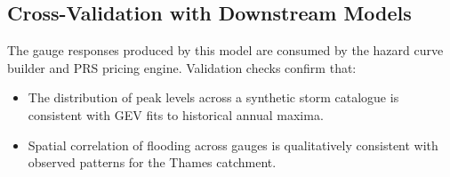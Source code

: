 \documentclass[11pt,a4paper]{article}
\begin{document}
\subsection{Cross-Validation with Downstream Models}

The gauge responses produced by this model are consumed by the hazard curve
builder and PRS pricing engine. Validation checks confirm that:
\begin{itemize}[nosep]
    \item The distribution of peak levels across a synthetic storm catalogue is
          consistent with GEV fits to historical annual maxima.
    \item Spatial correlation of flooding across gauges is qualitatively
          consistent with observed patterns for the Thames catchment.
\end{itemize}

\mkmlimitations
\end{document}
